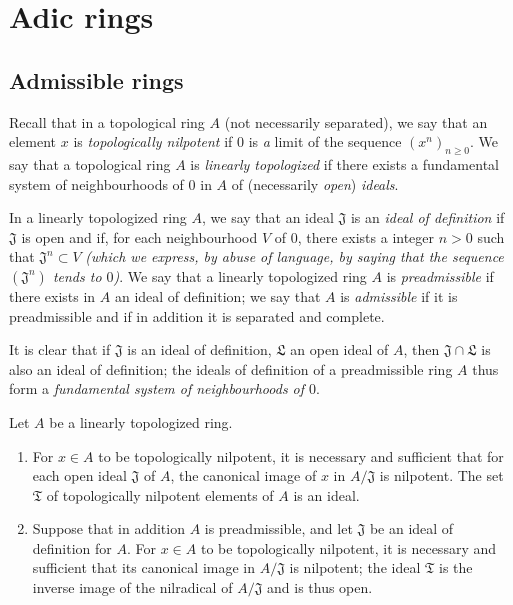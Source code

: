 \section{Adic rings}
\label{section:0.7}

\subsection{Admissible rings}
\label{subsection:0.7.1}

\begin{env}[7.1.1]
\label{0.7.1.1}
Recall that in a topological ring $A$ (not necessarily separated), we say that an element $x$
is \emph{topologically nilpotent} if $0$ is \emph{a} limit of the sequence
$(x^n)_{n\geq 0}$. We say that a topological ring $A$ is \emph{linearly topologized} if
there exists a fundamental system of neighbourhoods of $0$ in $A$ of (necessarily \emph{open})
\emph{ideals}.
\end{env}

\begin{definition}[7.1.2]
\label{0.7.1.2}
In a linearly topologized ring $A$, we say that an ideal $\mathfrak{J}$ is an \emph{ideal of
definition} if $\mathfrak{J}$ is open and if, for each neighbourhood $V$ of $0$, there exists
a integer $n>0$ such
that $\mathfrak{J}^n\subset V$ \emph{(which we express, by abuse of language, by saying that
the sequence $(\mathfrak{J}^n)$ \emph{tends to $0$})}. We say that a linearly topologized
ring $A$ is \emph{preadmissible} if there exists in $A$ an ideal of definition; we say that
$A$ is \emph{admissible} if it is preadmissible and if in addition it is separated and
complete.
\end{definition}

It is clear that if $\mathfrak{J}$ is an ideal of definition, $\mathfrak{L}$ an open ideal of
$A$, then $\mathfrak{J}\cap\mathfrak{L}$ is also an ideal of definition; the ideals of
definition of a preadmissible ring $A$ thus form a \emph{fundamental system of neighbourhoods
of $0$}.

\begin{lemma}[7.1.3]
\label{0.7.1.3}
Let $A$ be a linearly topologized ring.
\begin{enumerate}
  \item[{\rm(i)}] For $x\in A$ to be topologically nilpotent, it is necessary and sufficient that for
    each open ideal $\mathfrak{J}$ of $A$, the canonical image of $x$ in $A/\mathfrak{J}$ is
    nilpotent. The set $\mathfrak{T}$ of topologically nilpotent elements of $A$ is an ideal.
  \item[{\rm(ii)}] Suppose that in addition $A$ is preadmissible, and let $\mathfrak{J}$ be an ideal
    of definition for $A$. For $x\in A$ to be topologically nilpotent, it is necessary and
    sufficient that its canonical image in $A/\mathfrak{J}$ is nilpotent; the ideal
    $\mathfrak{T}$ is the inverse image of the nilradical of $A/\mathfrak{J}$ and is thus open.
\end{enumerate}
\end{lemma}

